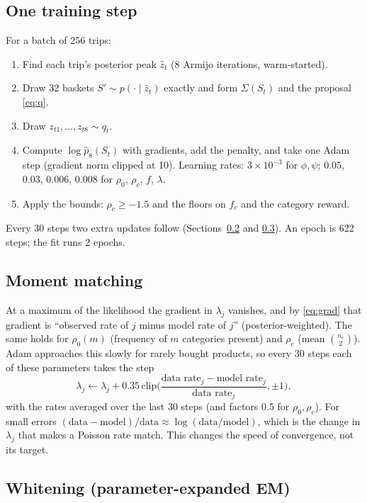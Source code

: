 \documentclass[11pt,a4paper]{article}
\theoremstyle{remark}
\begin{document}
\subsection{One training step}

For a batch of 256 trips:
\begin{enumerate}
\item Find each trip's posterior peak $\hat z_t$ (8 Armijo iterations, warm-started).
\item Draw 32 baskets $S'\sim p(\cdot\mid\hat z_t)$ exactly and form $\Sigma(S_t)$ and the proposal \eqref{eq:q}.
\item Draw $z_{t1},\dots,z_{t8}\sim q_t$.
\item Compute $\log\hat p_8(S_t)$ with gradients, add the penalty, and take one Adam step (gradient norm
  clipped at 10). Learning rates: $3\times10^{-3}$ for $\phi,\psi$; $0.05$, $0.03$, $0.006$, $0.008$ for
  $\rho_0$, $\rho_c$, $f$, $\lambda$.
\item Apply the bounds: $\rho_c\ge-1.5$ and the floors on $f_c$ and the category reward.
\end{enumerate}
Every 30 steps two extra updates follow (Sections~\ref{sec:mm} and \ref{sec:whiten}). An epoch is 622 steps;
the fit runs 2 epochs.

\subsection{Moment matching}
\label{sec:mm}

At a maximum of the likelihood the gradient in $\lambda_j$ vanishes, and by \eqref{eq:grad} that gradient
is ``observed rate of $j$ minus model rate of $j$'' (posterior-weighted). The same holds for $\rho_0(m)$
(frequency of $m$ categories present) and $\rho_c$ (mean $\binom{n_c}{2}$). Adam approaches this slowly for
rarely bought products, so every 30 steps each of these parameters takes the step
\[
\lambda_j\leftarrow\lambda_j+0.35\,\mathrm{clip}\Big(\frac{\text{data rate}_j-\text{model rate}_j}{\text{data rate}_j},\pm1\Big),
\]
with the rates averaged over the last 30 steps (and factors $0.5$ for $\rho_0,\rho_c$). For small errors
$(\text{data}-\text{model})/\text{data}\approx\log(\text{data}/\text{model})$, which is the change in $\lambda_j$
that makes a Poisson rate match. This changes the speed of convergence, not its target.

\subsection{Whitening (parameter-expanded EM)}
\label{sec:whiten}
\end{document}
